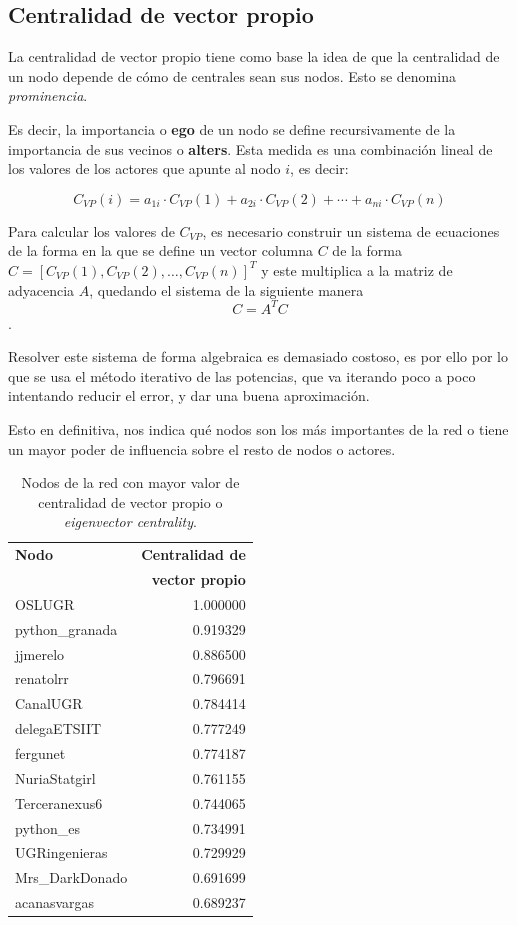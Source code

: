 \documentclass[paper=a4, fontsize=11pt]{article} %
\numberwithin{equation}{section} %
\numberwithin{figure}{section} %
\numberwithin{table}{section} %
\begin{document}
\subsection{Centralidad de vector propio}

La centralidad de vector propio tiene como base la idea de que la centralidad de un nodo depende de cómo de centrales sean sus nodos. Esto se denomina \textit{prominencia}.

Es decir, la importancia o \textbf{ego} de un nodo se define recursivamente de la importancia de sus vecinos o \textbf{alters}. Esta medida es una combinación lineal de los valores de los actores que apunte al nodo $i$, es decir:

\begin{displaymath}
  C_{VP}(i) = a_{1i}\cdot C_{VP}(1) + a_{2i}\cdot C_{VP}(2) + \cdots + a_{ni}\cdot C_{VP}(n)
\end{displaymath}

Para calcular los valores de $C_{VP}$, es necesario construir un sistema de ecuaciones de la forma en la que se define un vector columna $C$ de la forma $C=[C_{VP}(1),C_{VP}(
2),\ldots,C_{VP}(n)]^T$ y este multiplica a la matriz de adyacencia $A$, quedando el sistema de la siguiente manera $$C=A^TC$$.

Resolver este sistema de forma algebraica es demasiado costoso, es por ello por lo que se usa el método iterativo de las potencias, que va iterando poco a poco intentando reducir el error, y dar una buena aproximación.

Esto en definitiva, nos indica qué nodos son los más importantes de la red o tiene un mayor poder de influencia sobre el resto de nodos o actores.

\begin{table}[H]
\begin{tabular}{l|r}
\textbf{Nodo} & \textbf{Centralidad de} \\
& \textbf{vector propio} \\
\hline
OSLUGR & 1.000000 \\
python\_granada & 0.919329 \\
jjmerelo & 0.886500 \\
renatolrr & 0.796691 \\
CanalUGR & 0.784414 \\
delegaETSIIT & 0.777249 \\
fergunet & 0.774187 \\
NuriaStatgirl & 0.761155 \\
Terceranexus6 & 0.744065 \\
python\_es & 0.734991 \\
UGRingenieras & 0.729929 \\
Mrs\_DarkDonado & 0.691699 \\
acanasvargas & 0.689237 \\
\end{tabular}
\label{eigenvec}
\caption{Nodos de la red con mayor valor de centralidad de vector propio o \textit{eigenvector centrality}.}
\end{table}
\end{document}

